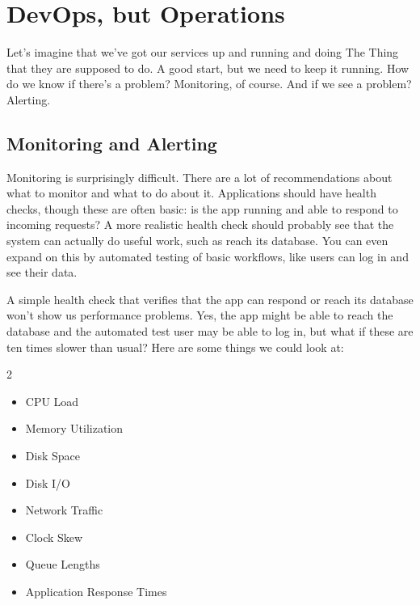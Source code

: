 




\section*{DevOps, but Operations}

Let's imagine that we've got our services up and running and doing The Thing that they are supposed to do. A good start, but we need to keep it running. How do we know if there's a problem? Monitoring, of course. And if we see a problem? Alerting.

\subsection*{Monitoring and Alerting}

Monitoring is surprisingly difficult. There are a lot of recommendations about what to monitor and what to do about it. Applications should have health checks, though these are often basic: is the app running and able to respond to incoming requests? A more realistic health check should probably see that the system can actually do useful work, such as reach its database. You can even expand on this by automated testing of basic workflows, like users can log in and see their data.

A simple health check that verifies that the app can respond or reach its database won't show us performance problems. Yes, the app might be able to reach the database and the automated test user may be able to log in, but what if these are ten times slower than usual? Here are some things we could look at:

\begin{multicols}{2}
\begin{itemize}
	\item CPU Load
	\item Memory Utilization
	\item Disk Space
	\item Disk I/O
	\item Network Traffic
	\item Clock Skew
	\item Queue Lengths
	\item Application Response Times
\end{itemize}
\end{multicols}

